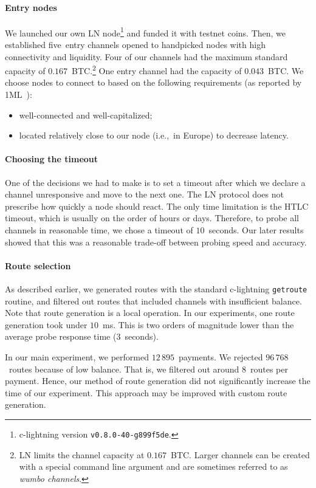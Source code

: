 \paragraph{Entry nodes}
We launched our own LN node\footnote{c-lightning version \texttt{v0.8.0-40-g899f5de}.} and funded it with testnet coins.
Then, we established five~entry channels opened to handpicked nodes with high connectivity and liquidity.
Four of our channels had the maximum standard capacity of $0.167$~BTC\@.\footnote{LN limits the channel capacity at $0.167$~BTC\@. Larger channels can be created with a special command line argument and are sometimes referred to as \textit{wumbo channels}.}
One entry channel had the capacity of $0.043$~BTC\@.
We choose nodes to connect to based on the following requirements (as reported by 1ML~\cite{1MLTopConnected}):
\begin{itemize}
	\item well-connected and well-capitalized;
	\item located relatively close to our node (i.e.,~in Europe) to decrease latency.
\end{itemize}

\paragraph{Choosing the timeout}
One of the decisions we had to make is to set a timeout after which we declare a channel unresponsive and move to the next one.
The LN protocol does not prescribe how quickly a node should react.
The only time limitation is the HTLC timeout, which is usually on the order of hours or days.
Therefore, to probe all channels in reasonable time, we chose a timeout of $10$~seconds.
Our later results showed that this was a reasonable trade-off between probing speed and accuracy.

\paragraph{Route selection}
As described earlier, we generated routes with the standard c-lightning \texttt{getroute} routine, and filtered out routes that included channels with insufficient balance.
Note that route generation is a local operation.
In our experiments, one route generation took under $10$~ms.
This is two orders of magnitude lower than the average probe response time ($3$~seconds).

In our main experiment, we performed $12\,895$~payments.
We rejected $96\,768$~routes because of low balance.
That is, we filtered out around $8$~routes per payment.
Hence, our method of route generation did not significantly increase the time of our experiment.
This approach may be improved with custom route generation.

